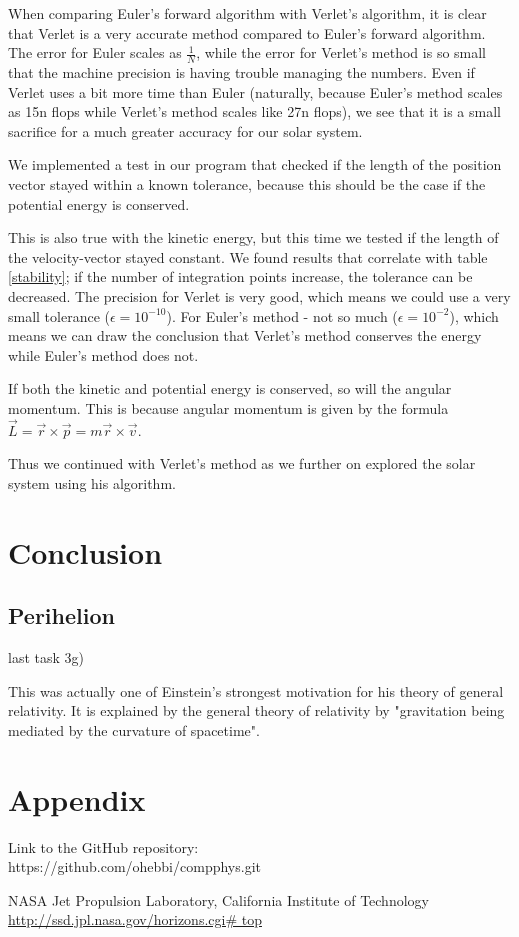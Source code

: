\documentclass{article}
\begin{document}
When comparing Euler's forward algorithm with Verlet's algorithm, it is clear that Verlet is a very accurate method compared to Euler's forward algorithm. The error for Euler scales as $\frac{1}{N}$, while the error for Verlet's method is so small that the machine precision is having trouble managing the numbers. Even if Verlet uses a bit more time than Euler (naturally, because Euler's method scales as 15n flops while Verlet's method scales like 27n flops), we see that it is a small sacrifice for a much greater accuracy for our solar system.

We implemented a test in our program that checked if the length of the position vector stayed within a known tolerance, because this should be the case if the potential energy is conserved.

This is also true with the kinetic energy, but this time we tested if the length of the velocity-vector stayed constant. We found results that correlate with table \ref{stability}; if the number of integration points increase, the tolerance can be decreased. The precision for Verlet is very good, which means we could use a very small tolerance ($\epsilon = 10^{-10}$). For Euler's method - not so much ($\epsilon = 10^{-2}$), which means we can draw the conclusion that Verlet's method conserves the energy while Euler's method does not.

If both the kinetic and potential energy is conserved, so will the angular momentum. This is because angular momentum is given by the formula $\vec{L}=\vec{r} \times \vec{p} =m \vec{r} \times \vec{v}$.


Thus we continued with Verlet's method as we further on explored the solar system using his algorithm.


\section{Conclusion}


\subsection{Perihelion}
last task 3g)

This was actually one of Einstein's strongest motivation for his theory of general relativity.
It is explained by the general theory of relativity by "gravitation being mediated by the curvature of spacetime".


\section{Appendix}
Link to the GitHub repository:\\

https://github.com/ohebbi/compphys.git

\begin{thebibliography}{}
NASA Jet Propulsion Laboratory, California Institute of Technology\\
\url{http://ssd.jpl.nasa.gov/horizons.cgi# top}

\end{thebibliography}
\end{document}
